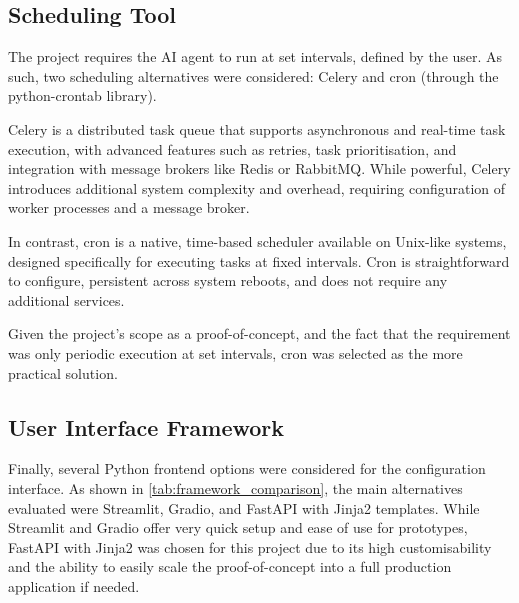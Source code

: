 \documentclass[a4paper]{report}
\begin{document}
\subsection{Scheduling Tool}

The project requires the AI agent to run at set intervals, defined by the user. As such, two scheduling alternatives were considered: Celery and cron (through the python-crontab library).

Celery is a distributed task queue that supports asynchronous and real-time task execution, with advanced features such as retries, task prioritisation, and integration with message brokers like Redis or RabbitMQ. While powerful, Celery introduces additional system complexity and overhead, requiring configuration of worker processes and a message broker.

In contrast, cron is a native, time-based scheduler available on Unix-like systems, designed specifically for executing tasks at fixed intervals. Cron is straightforward to configure, persistent across system reboots, and does not require any additional services.

Given the project's scope as a proof-of-concept, and the fact that the requirement was only periodic execution at set intervals, cron was selected as the more practical solution.

\subsection{User Interface Framework}

Finally, several Python frontend options were considered for the configuration interface. As shown in \autoref{tab:framework_comparison}, the main alternatives evaluated were Streamlit, Gradio, and FastAPI with Jinja2 templates. While Streamlit and Gradio offer very quick setup and ease of use for prototypes, FastAPI with Jinja2 was chosen for this project due to its high customisability and the ability to easily scale the proof-of-concept into a full production application if needed.
\end{document}
